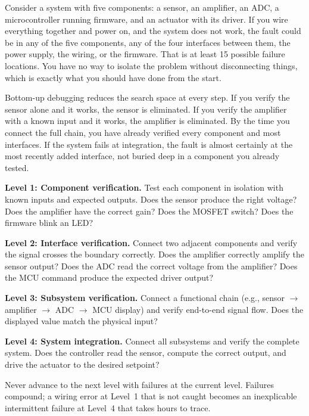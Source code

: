 \documentclass[11pt,letterpaper,twoside,openany]{book}
\begin{document}
Consider a system with five components: a sensor, an amplifier, an ADC, a microcontroller running firmware, and an actuator with its driver. If you wire everything together and power on, and the system does not work, the fault could be in any of the five components, any of the four interfaces between them, the power supply, the wiring, or the firmware. That is at least 15 possible failure locations. You have no way to isolate the problem without disconnecting things, which is exactly what you should have done from the start.

Bottom-up debugging reduces the search space at every step. If you verify the sensor alone and it works, the sensor is eliminated. If you verify the amplifier with a known input and it works, the amplifier is eliminated. By the time you connect the full chain, you have already verified every component and most interfaces. If the system fails at integration, the fault is almost certainly at the most recently added interface, not buried deep in a component you already tested.

\begin{keyconceptbox}
\textbf{Level 1: Component verification.} Test each component in isolation with known inputs and expected outputs. Does the sensor produce the right voltage? Does the amplifier have the correct gain? Does the MOSFET switch? Does the firmware blink an LED?

\textbf{Level 2: Interface verification.} Connect two adjacent components and verify the signal crosses the boundary correctly. Does the amplifier correctly amplify the sensor output? Does the ADC read the correct voltage from the amplifier? Does the MCU command produce the expected driver output?

\textbf{Level 3: Subsystem verification.} Connect a functional chain (e.g., sensor $\to$ amplifier $\to$ ADC $\to$ MCU display) and verify end-to-end signal flow. Does the displayed value match the physical input?

\textbf{Level 4: System integration.} Connect all subsystems and verify the complete system. Does the controller read the sensor, compute the correct output, and drive the actuator to the desired setpoint?

Never advance to the next level with failures at the current level. Failures compound; a wiring error at Level~1 that is not caught becomes an inexplicable intermittent failure at Level~4 that takes hours to trace.
\end{keyconceptbox}
\end{document}
